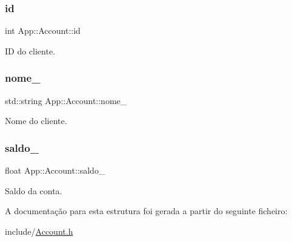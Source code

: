 \subsubsection{\texorpdfstring{id}{id}}
{\footnotesize\ttfamily int App\+::\+Account\+::id}



ID do cliente. 

\mbox{\label{structApp_1_1Account_aa636b3b67fe15ab752ef087d42a6fe84}} 
\subsubsection{\texorpdfstring{nome\+\_\+}{nome\_}}
{\footnotesize\ttfamily std\+::string App\+::\+Account\+::nome\+\_\+}



Nome do cliente. 

\mbox{\label{structApp_1_1Account_a985daa05cb4ae4146b7c356852f4517d}} 
\subsubsection{\texorpdfstring{saldo\+\_\+}{saldo\_}}
{\footnotesize\ttfamily float App\+::\+Account\+::saldo\+\_\+}



Saldo da conta. 



A documentação para esta estrutura foi gerada a partir do seguinte ficheiro\+:\begin{DoxyCompactItemize}
\item 
include/\hyperlink{Account_8h}{Account.\+h}\end{DoxyCompactItemize}
